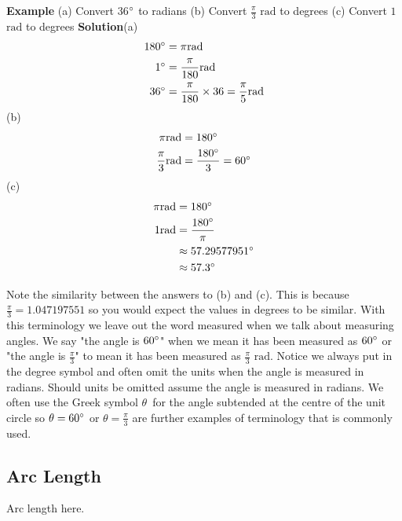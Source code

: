 \textbf{Example}
(a) Convert 36$\mbox{{\ensuremath{{}^\circ}}}$ to radians 
(b) Convert $\frac{\pi }{3}$ $\mbox{rad}$ to degrees 
(c) Convert $1$ $\mbox{rad}$ to degrees 
\textbf{Solution}(a)
\begin{align*}180 \mbox{{\ensuremath{{}^\circ}}} &  =  \pi \text{}\mbox{rad} \\
1 \mbox{{\ensuremath{{}^\circ}}} &  =  \frac{\pi }{180}\text{}\mbox{rad} \\
36 \mbox{{\ensuremath{{}^\circ}}} &  =  \frac{\pi }{180} \times 36 =\frac{\pi }{5}\text{}\mbox{rad}\end{align*}
(b)
\begin{align*}\pi  \mbox{rad} &  =  180 \mbox{{\ensuremath{{}^\circ}}} \\
\frac{\pi }{3} \mbox{rad} &  = \frac{180 \mbox{{\ensuremath{{}^\circ}}}}{3} =60 \mbox{{\ensuremath{{}^\circ}}}\end{align*}
(c)
\begin{align*}\pi  \mbox{rad} &  =  180 \mbox{{\ensuremath{{}^\circ}}} \\
1 \mbox{rad} &  =  \frac{180 \mbox{{\ensuremath{{}^\circ}}}}{\pi } \\
 &  \approx   57.29577951 \mbox{{\ensuremath{{}^\circ}}} \\
 &  \approx   57.3 \mbox{{\ensuremath{{}^\circ}}}\end{align*}

Note the similarity between the answers to (b) and (c). This is because $\frac{\pi }{3} =1.047197551$ so you would expect the values in degrees to be similar.  With this terminology we leave out the word measured when we talk about measuring angles. We say "the angle is $60 \mbox{{\ensuremath{{}^\circ}}}$" when we mean it has been measured as $60 \mbox{{\ensuremath{{}^\circ}}}$ or "the angle is $\frac{\pi }{3}$" to mean it has been measured as $\frac{\pi }{3}$ $\mbox{rad}$. Notice we always put in the degree symbol and often omit the units when the angle is measured in radians. Should units be omitted assume the angle is measured in radians. We often use the Greek symbol $\theta $\ for the angle subtended at the centre of the unit circle so $\theta  =60 \mbox{{\ensuremath{{}^\circ}}}$ or $\theta  =\frac{\pi }{3}$ are further examples of terminology that is commonly used.

\subsection*{Arc Length}
Arc length here.

